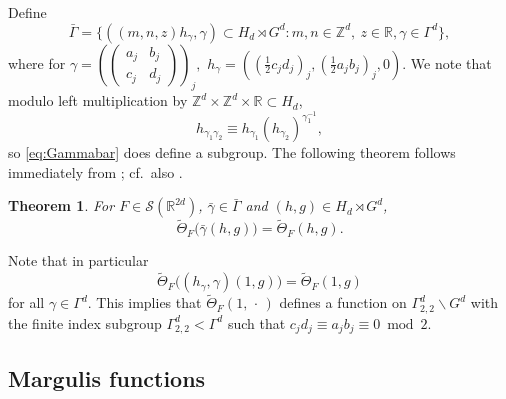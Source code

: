 \documentclass[12pt]{amsart}
\newtheorem{thm}{Theorem}[section]
\theoremstyle{definition}
\theoremstyle{remark}
\numberwithin{equation}{section}
\newcommand{\R}{\mathbb{R}}
\newcommand{\Z}{\mathbb{Z}}
\newcommand{\cS}{\mathcal{S}}
\begin{document}
Define
\begin{equation}
  \label{eq:Gammabar}
  \bar{\Gamma} = \{ ((m, n, z)h_\gamma, \gamma) \subset H_d\rtimes G^d : m, n \in \Z^d,\ z \in \R, \gamma \in \Gamma^d\},
\end{equation}
where for $\gamma = (
\begin{pmatrix}
  a_j & b_j \\
  c_j & d_j
\end{pmatrix}
)_j,$ $h_\gamma = ((\tfrac{1}{2} c_jd_j)_j, (\tfrac{1}{2}a_jb_j)_j , 0)$.
We note that modulo left multiplication by $\Z^d \times \Z^d \times \R \subset H_d$,
\begin{equation}
  \label{eq:hgammamult}
  h_{\gamma_1 \gamma_2} \equiv h_{\gamma_1} (h_{\gamma_2})^{\gamma_1^{-1}},
\end{equation}
so \eqref{eq:Gammabar} does define a subgroup. The following theorem follows immediately from \cite[Theorem~4.1]{MarklofWelsh2021a}; cf.~also \cite{Marklof2003}.

\begin{thm}
  \label{thm:thetaautomorphy}
  For $F\in\cS(\R^{2d})$,  $\bar\gamma \in \bar{\Gamma}$ and $(h,g) \in H_d \rtimes G^d$,
  \begin{equation}
    \label{eq:thetaautomorphy}
     \widetilde\Theta_F\big(\bar\gamma (h, g)\big) =  \widetilde\Theta_F(h, g) .
  \end{equation}
\end{thm}

Note that in particular 
\begin{equation}
\label{thetainversion}
\widetilde\Theta_F\big((h_\gamma, \gamma)(1, g)\big) =  \widetilde\Theta_F(1, g)
\end{equation}
for all $\gamma\in\Gamma^d$.
This implies that $\widetilde\Theta_F(1, \,\cdot\,) $ defines a function on $\Gamma_{2,2}^d\backslash G^d$ with the finite index subgroup $\Gamma_{2,2}^d<\Gamma^d$ such that $c_jd_j \equiv a_jb_j \equiv 0 \bmod 2$. 

\subsection{Margulis functions}
\label{sec:Margulisfunctions}
\end{document}
